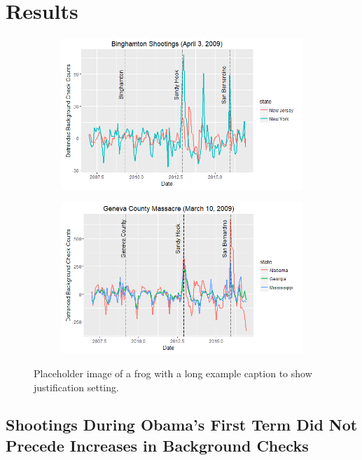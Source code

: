 \documentclass[9pt,twocolumn,twoside,lineno]{pnas-new}
\begin{document}
\section{Results}
\begin{figure}%
\centering
\begin{subfigure}{.5\textwidth}
  \centering
  \includegraphics[width=\linewidth]{figures/binghamton}
\end{subfigure}%
\begin{subfigure}{.5\textwidth}
  \centering
  \includegraphics[width=\linewidth]{figures/geneva-county}
\end{subfigure}
\caption{Placeholder image of a frog with a long example caption to show justification setting.}
\label{fig:}
\end{figure}

\subsection{Shootings During Obama's First Term Did Not Precede Increases in Background Checks}
\end{document}
